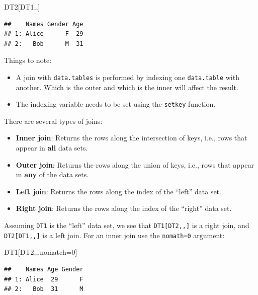 \documentclass[]{book}
\newenvironment{Shaded}{\begin{snugshade}}{\end{snugshade}}
\newcommand{\DecValTok}[1]{\textcolor[rgb]{0.00,0.00,0.81}{#1}}
\newcommand{\NormalTok}[1]{#1}
\providecommand{\tightlist}{%
  \setlength{\itemsep}{0pt}\setlength{\parskip}{0pt}}
\theoremstyle{definition}
\theoremstyle{definition}
\theoremstyle{definition}
\theoremstyle{remark}
\begin{document}
\begin{Shaded}
\begin{Highlighting}[]
\NormalTok{DT2[DT1,,] }
\end{Highlighting}
\end{Shaded}

\begin{verbatim}
##    Names Gender Age
## 1: Alice      F  29
## 2:   Bob      M  31
\end{verbatim}

Things to note:

\begin{itemize}
\tightlist
\item
  A join with \texttt{data.tables} is performed by indexing one \texttt{data.table} with another. Which is the outer and which is the inner will affect the result.
\item
  The indexing variable needs to be set using the \texttt{setkey} function.
\end{itemize}

There are several types of joins:

\begin{itemize}
\tightlist
\item
  \textbf{Inner join}: Returns the rows along the intersection of keys, i.e., rows that appear in \textbf{all} data sets.
\item
  \textbf{Outer join}: Returns the rows along the union of keys, i.e., rows that appear in \textbf{any} of the data sets.
\item
  \textbf{Left join}: Returns the rows along the index of the ``left'' data set.
\item
  \textbf{Right join}: Returns the rows along the index of the ``right'' data set.
\end{itemize}

Assuming \texttt{DT1} is the ``left'' data set, we see that \texttt{DT1{[}DT2,,{]}} is a right join, and \texttt{DT2{[}DT1,,{]}} is a left join.
For an inner join use the \texttt{nomath=0} argument:

\begin{Shaded}
\begin{Highlighting}[]
\NormalTok{DT1[DT2,,,nomatch=}\DecValTok{0}\NormalTok{]}
\end{Highlighting}
\end{Shaded}

\begin{verbatim}
##    Names Age Gender
## 1: Alice  29      F
## 2:   Bob  31      M
\end{verbatim}
\end{document}

